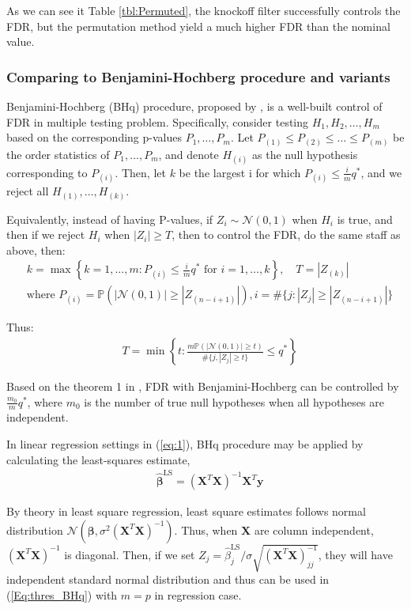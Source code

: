 \documentclass{uwstat572}
\begin{document}
As we can see it Table \ref{tbl:Permuted}, the knockoff filter successfully controls the FDR, but the permutation method yield a much higher FDR than the nominal value. 

\subsubsection{Comparing to Benjamini-Hochberg procedure and variants}\label{sec:BHq}
Benjamini-Hochberg (BHq) procedure, proposed by \cite{benjamini1995controlling}, is a well-built control of FDR in multiple testing problem. Specifically, consider testing $H_1, H_2,\dots, H_m$ based on the corresponding p-values $P_1,\dots, P_m$. Let $P_{(1)}\leq P_{(2)}\leq\dots\leq P_{(m)}$ be the order statistics of $P_1,\dots, P_m$, and denote $H_{(i)}$ as the null hypothesis corresponding to $P_{(i)}$. Then, let $k$ be the largest i for which $P_{(i)}\leq \frac{i}{m}q^\ast$, and we reject all $H_{(1)},\dots, H_{(k)}$. 

Equivalently, instead of having P-values, if $Z_i \sim \mathcal{N}(0,1)$ when $H_i$ is true, and then if we reject $H_i$ when $|Z_i| \geq T$, then to control the FDR, do the same staff as above, then:
\begin{align*}
& k = \max\left\{k=1,\dots,m: P_{(i)}\leq \frac{i}{m}q^\ast \text{ for }i=1,\dots, k \right\}, \quad T = |Z_{(k)}|\\
& \text{where }P_{(i)} = \mathbb{P}(|\mathcal{N}(0,1)|\geq |Z_{(n-i+1)}|), i=\#\{j: |Z_j| \geq  |Z_{(n-i+1)}|\} 
\end{align*} 

Thus:
\begin{align}\label{Eq:thres_BHq}
&T = \min\left\{t: \frac{m \mathbb{P}(|\mathcal{N}(0,1)|\geq t)}{\# \{j, |Z_j|\geq t \}}\leq q^\ast \right\}
\end{align}

Based on the theorem 1 in \cite{benjamini1995controlling}, FDR with Benjamini-Hochberg can be controlled by $\frac{m_0}{m}q^\ast$, where $m_0$ is the number of true null hypotheses when all hypotheses are independent.

In linear regression settings in (\ref{eq:1}), BHq procedure may be applied by calculating the least-squares estimate,
\begin{align*}
& \hat{\bm{\beta}}^{\text{LS}} =(\bm{X}^T\bm{X})^{-1}\bm{X}^T\bm{y}
\end{align*}

By theory in least square regression, least square estimates follows normal distribution $\mathcal{N}(\bm{\beta},\sigma^2(\bm{X}^T\bm{X})^{-1} )$. Thus, when $\bm{X}$ are column independent, $(\bm{X}^T\bm{X})^{-1}$ is diagonal. Then, if we set $Z_j = \hat{\beta}_j^\text{LS}/\sigma\sqrt{(\bm{X}^T\bm{X})_{jj}^{-1}}$, they will have independent standard normal distribution and thus can be used in (\ref{Eq:thres_BHq}) with $m=p$ in regression case.
\end{document}
